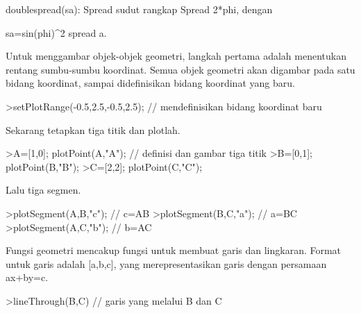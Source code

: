 \documentclass[a4paper,10pt]{article}
\begin{document}
\begin{eulernotebook}
\begin{eulercomment}
\begin{eulercomment}
\begin{eulercomment}
\begin{eulercomment}
\begin{eulercomment}
\begin{eulercomment}
\begin{eulercomment}
\begin{eulercomment}
\begin{eulercomment}
\begin{eulercomment}
\begin{eulercomment}
\begin{eulercomment}
\begin{eulercomment}
\begin{eulercomment}
\begin{eulercomment}
\begin{eulercomment}
\begin{eulercomment}
\begin{eulercomment}
\begin{eulercomment}
\begin{eulercomment}
\begin{eulercomment}
\begin{eulercomment}
\begin{eulercomment}
\begin{eulercomment}
\begin{eulercomment}
\begin{eulercomment}
\begin{eulercomment}
\begin{eulercomment}
\begin{eulercomment}
\begin{eulercomment}
\begin{eulerttcomment}
  doublespread(sa): Spread sudut rangkap Spread 2*phi, dengan
\end{eulerttcomment}
\begin{eulercomment}
sa=sin(phi)\textasciicircum{}2 spread a.

\end{eulercomment}
\begin{eulercomment}
Untuk menggambar objek-objek geometri, langkah pertama adalah
menentukan rentang sumbu-sumbu koordinat. Semua objek geometri akan
digambar pada satu bidang koordinat, sampai didefinisikan bidang
koordinat yang baru.
\end{eulercomment}
\begin{eulerprompt}
>setPlotRange(-0.5,2.5,-0.5,2.5); // mendefinisikan bidang koordinat baru 
\end{eulerprompt}
\begin{eulercomment}
Sekarang tetapkan tiga titik dan plotlah.
\end{eulercomment}
\begin{eulerprompt}
>A=[1,0]; plotPoint(A,"A"); // definisi dan gambar tiga titik
>B=[0,1]; plotPoint(B,"B");
>C=[2,2]; plotPoint(C,"C");
\end{eulerprompt}
\begin{eulercomment}
Lalu tiga segmen.
\end{eulercomment}
\begin{eulerprompt}
>plotSegment(A,B,"c"); // c=AB
>plotSegment(B,C,"a"); // a=BC
>plotSegment(A,C,"b"); // b=AC
\end{eulerprompt}
\begin{eulercomment}
Fungsi geometri mencakup fungsi untuk membuat garis dan lingkaran.
Format untuk garis adalah [a,b,c], yang merepresentasikan garis dengan
persamaan ax+by=c.
\end{eulercomment}
\begin{eulerprompt}
>lineThrough(B,C) // garis yang melalui B dan C

\end{eulerprompt}
\end{eulercomment}
\end{eulercomment}
\end{eulercomment}
\end{eulercomment}
\end{eulercomment}
\end{eulercomment}
\end{eulercomment}
\end{eulercomment}
\end{eulercomment}
\end{eulercomment}
\end{eulercomment}
\end{eulercomment}
\end{eulercomment}
\end{eulercomment}
\end{eulercomment}
\end{eulercomment}
\end{eulercomment}
\end{eulercomment}
\end{eulercomment}
\end{eulercomment}
\end{eulercomment}
\end{eulercomment}
\end{eulercomment}
\end{eulercomment}
\end{eulercomment}
\end{eulercomment}
\end{eulercomment}
\end{eulercomment}
\end{eulercomment}
\end{eulercomment}
\end{eulernotebook}
\end{document}
